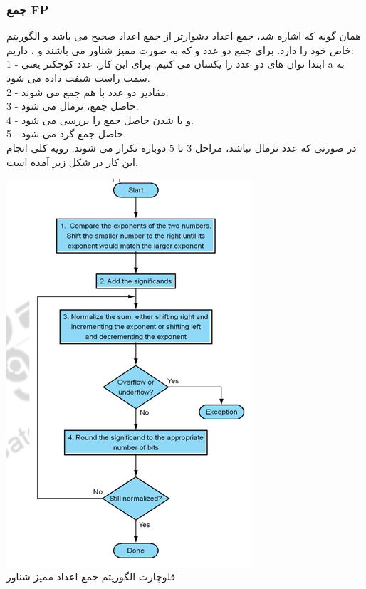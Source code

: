 \documentclass[12pt,titlepage,a4page , tikz , multi,table , svgnames,xcdraw]{article}
\begin{document}
\subsubsection{جمع FP}
	همان گونه که اشاره شد، جمع اعداد 
     دشوارتر از جمع اعداد صحیح می باشد و الگوریتم خاص خود را دارد. برای جمع دو عدد 
     و  
     که به صورت ممیز شناور می باشند و 
    ، داریم: \\
	1 - ابتدا توان های دو عدد را یکسان می کنیم. برای این کار، عدد کوچکتر یعنی a به سمت راست شیفت داده می شود. \\
	2 - مقادیر  دو عدد با هم جمع می شوند. \\
	3 - حاصل جمع، نرمال می شود. \\
	4 - 
     و یا 
     شدن حاصل جمع را بررسی می شود. \\
	5 - حاصل جمع گرد می شود.\\ 
	در صورتی که عدد نرمال نباشد، مراحل 3 تا 5 دوباره تکرار می شوند.
	رویه کلی انجام این کار در شکل زیر آمده است.

\begin{center}
\includegraphics[scale=0.8]
    {Images/Introduction/Floating_point_sum.png}\\
        \caption{فلوچارت الگوریتم جمع اعداد ممیز شناور}
\end{center}
\end{document}
